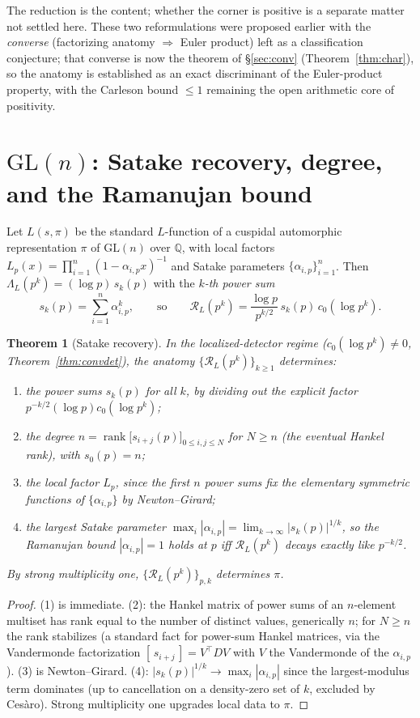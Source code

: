 \documentclass[11pt]{amsart}
\newtheorem{theorem}{Theorem}[section]
\theoremstyle{definition}
\theoremstyle{remark}
\newcommand{\cR}{\mathcal R}
\newcommand{\GL}{\mathrm{GL}}
\DeclareMathOperator{\rank}{rank}
\begin{document}
The reduction is the content; whether the corner is positive is a separate matter
not settled here. These two reformulations were proposed earlier with the
\emph{converse} (factorizing anatomy $\Rightarrow$ Euler product) left as a
classification conjecture; that converse is now the theorem of
\S\ref{sec:conv} (Theorem~\ref{thm:char}), so the anatomy is established as an
exact discriminant of the Euler-product property, with the Carleson bound $\le1$
remaining the open arithmetic core of positivity.

\section{$\GL(n)$: Satake recovery, degree, and the Ramanujan bound}\label{sec:gln}
Let $L(s,\pi)$ be the standard $L$-function of a cuspidal automorphic
representation $\pi$ of $\GL(n)$ over $\mathbb Q$, with local factors
$L_p(x)=\prod_{i=1}^n(1-\alpha_{i,p}x)^{-1}$ and Satake parameters
$\{\alpha_{i,p}\}_{i=1}^n$. Then $\Lambda_L(p^k)=(\log p)\,s_k(p)$ with the
\emph{$k$-th power sum}
\[
s_k(p)=\sum_{i=1}^n\alpha_{i,p}^k,\qquad\text{so}\qquad
\cR_L(p^k)=\frac{\log p}{p^{k/2}}\,s_k(p)\,c_0(\log p^k).
\]

\begin{theorem}[Satake recovery]\label{thm:satake}
In the localized-detector regime ($c_0(\log p^k)\ne0$, Theorem~\ref{thm:convdet}),
the anatomy $\{\cR_L(p^k)\}_{k\ge1}$ determines:
\begin{enumerate}
\item the power sums $s_k(p)$ for all $k$, by dividing out the explicit factor
$p^{-k/2}(\log p)c_0(\log p^k)$;
\item the degree $n=\rank\bigl[s_{i+j}(p)\bigr]_{0\le i,j\le N}$ for $N\ge n$
(the eventual Hankel rank), with $s_0(p)=n$;
\item the local factor $L_p$, since the first $n$ power sums fix the elementary
symmetric functions of $\{\alpha_{i,p}\}$ by Newton--Girard;
\item the largest Satake parameter $\max_i|\alpha_{i,p}|=\lim_{k\to\infty}
|s_k(p)|^{1/k}$, so the Ramanujan bound $|\alpha_{i,p}|=1$ holds at $p$ iff
$\cR_L(p^k)$ decays exactly like $p^{-k/2}$.
\end{enumerate}
By strong multiplicity one, $\{\cR_L(p^k)\}_{p,k}$ determines $\pi$.
\end{theorem}
\begin{proof}
(1) is immediate. (2): the Hankel matrix of power sums of an $n$-element multiset
has rank equal to the number of distinct values, generically $n$; for $N\ge n$
the rank stabilizes (a standard fact for power-sum Hankel matrices, via the
Vandermonde factorization $[\,s_{i+j}\,]=V^\top D V$ with $V$ the Vandermonde of
the $\alpha_{i,p}$). (3) is Newton--Girard. (4): $|s_k(p)|^{1/k}\to\max_i
|\alpha_{i,p}|$ since the largest-modulus term dominates (up to cancellation on a
density-zero set of $k$, excluded by Cesàro). Strong multiplicity one upgrades
local data to $\pi$.
\end{proof}
\end{document}
